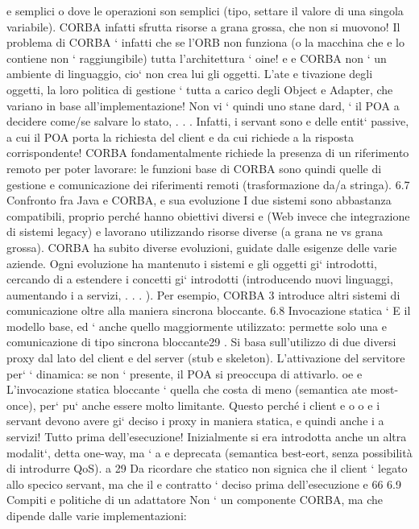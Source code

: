 \documentclass[a4paper,12pt]{article}
\begin{document}
e
semplici o dove le operazioni son semplici (tipo, settare il valore di una singola
variabile). CORBA infatti sfrutta risorse a grana grossa, che non si muovono!
Il problema di CORBA ` infatti che se l'ORB non funziona (o la macchina che
e
lo contiene non ` raggiungibile) tutta l'architettura ` oine!
e
e
CORBA non ` un ambiente di linguaggio, cio` non crea lui gli oggetti. L'ate
e
tivazione degli oggetti, la loro politica di gestione ` tutta a carico degli Object
e
Adapter, che variano in base all'implementazione! Non vi ` quindi uno stane
dard, ` il POA a decidere come/se salvare lo stato, . . . Infatti, i servant sono
e
delle entit` passive, a cui il POA porta la richiesta del client e da cui richiede
a
la risposta corrispondente!
CORBA fondamentalmente richiede la presenza di un riferimento remoto
per poter lavorare: le funzioni base di CORBA sono quindi quelle di gestione e
comunicazione dei riferimenti remoti (trasformazione da/a stringa).
6.7
Confronto fra Java e CORBA, e sua evoluzione
I due sistemi sono abbastanza compatibili, proprio perché hanno obiettivi diversi
e
(Web invece che integrazione di sistemi legacy) e lavorano utilizzando risorse
diverse (a grana ne vs grana grossa).
CORBA ha subito diverse evoluzioni, guidate dalle esigenze delle varie aziende.
Ogni evoluzione ha mantenuto i sistemi e gli oggetti gi` introdotti, cercando di
a
estendere i concetti gi` introdotti (introducendo nuovi linguaggi, aumentando i
a
servizi, . . . ). Per esempio, CORBA 3 introduce altri sistemi di comunicazione
oltre alla maniera sincrona bloccante.
6.8
Invocazione statica
`
E il modello base, ed ` anche quello maggiormente utilizzato: permette solo una
e
comunicazione di tipo sincrona bloccante29 . Si basa sull'utilizzo di due diversi
proxy dal lato del client e del server (stub e skeleton). L'attivazione del servitore
per` ` dinamica: se non ` presente, il POA si preoccupa di attivarlo.
oe
e
L'invocazione statica bloccante ` quella che costa di meno (semantica ate
most-once), per` pu` anche essere molto limitante. Questo perché i client e
o
o
e
i servant devono avere gi` deciso i proxy in maniera statica, e quindi anche i
a
servizi! Tutto prima dell'esecuzione!
Inizialmente si era introdotta anche un altra modalit`, detta one-way, ma `
a
e
deprecata (semantica best-eort, senza possibilità di introdurre QoS).
a
29 Da ricordare che statico non signica che il client ` legato allo specico servant, ma che il
e
contratto ` deciso prima dell'esecuzione
e
66
6.9
Compiti e politiche di un adattatore
Non ` un componente CORBA, ma che dipende dalle varie implementazioni:
\end{document}
